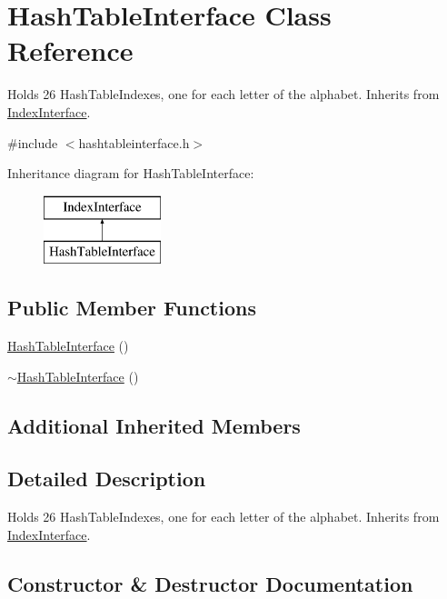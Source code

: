 \hypertarget{class_hash_table_interface}{}\section{Hash\+Table\+Interface Class Reference}
\label{class_hash_table_interface}


Holds 26 Hash\+Table\+Indexes, one for each letter of the alphabet. Inherits from \hyperlink{class_index_interface}{Index\+Interface}.  




{\ttfamily \#include $<$hashtableinterface.\+h$>$}

Inheritance diagram for Hash\+Table\+Interface\+:\begin{figure}[H]
\begin{center}
\leavevmode
\includegraphics[height=2.000000cm]{class_hash_table_interface}
\end{center}
\end{figure}
\subsection*{Public Member Functions}
\begin{DoxyCompactItemize}
\item 
\hyperlink{class_hash_table_interface_afcc090bbeda66c331a7a28623aad5d0c}{Hash\+Table\+Interface} ()
\item 
\hyperlink{class_hash_table_interface_ab0a34d3f1ee275590002fc4c5d4327fe}{$\sim$\+Hash\+Table\+Interface} ()
\end{DoxyCompactItemize}
\subsection*{Additional Inherited Members}


\subsection{Detailed Description}
Holds 26 Hash\+Table\+Indexes, one for each letter of the alphabet. Inherits from \hyperlink{class_index_interface}{Index\+Interface}. 

\subsection{Constructor \& Destructor Documentation}
\hypertarget{class_hash_table_interface_afcc090bbeda66c331a7a28623aad5d0c}{}
